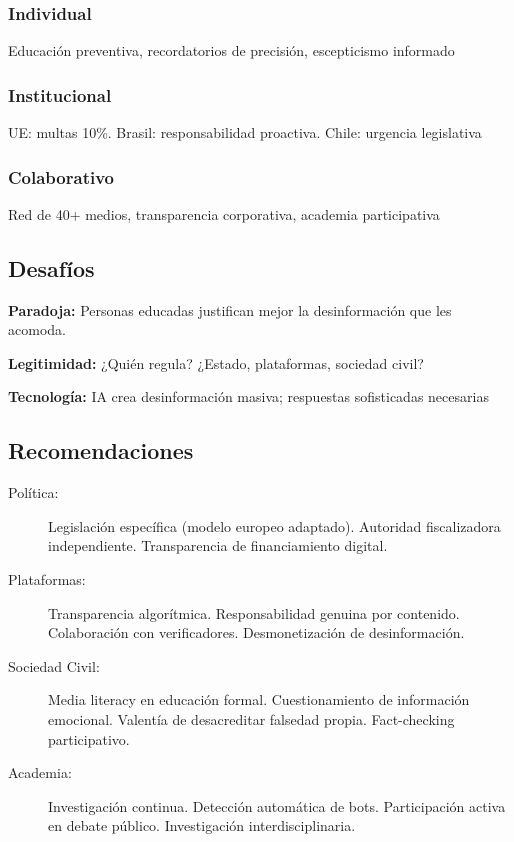 \subsubsection{Individual}
Educación preventiva, recordatorios de precisión, escepticismo informado

\subsubsection{Institucional}
UE: multas 10\%. Brasil: responsabilidad proactiva. Chile: urgencia legislativa

\subsubsection{Colaborativo}
Red de 40+ medios, transparencia corporativa, academia participativa

\subsection{Desafíos}

\textbf{Paradoja:} Personas educadas justifican mejor la desinformación que les acomoda.

\textbf{Legitimidad:} ¿Quién regula? ¿Estado, plataformas, sociedad civil?

\textbf{Tecnología:} IA crea desinformación masiva; respuestas sofisticadas necesarias

\subsection{Recomendaciones}

\begin{description}
    \item[Política:] Legislación específica (modelo europeo adaptado). Autoridad fiscalizadora independiente. Transparencia de financiamiento digital.
    
    \item[Plataformas:] Transparencia algorítmica. Responsabilidad genuina por contenido. Colaboración con verificadores. Desmonetización de desinformación.
    
    \item[Sociedad Civil:] Media literacy en educación formal. Cuestionamiento de información emocional. Valentía de desacreditar falsedad propia. Fact-checking participativo.
    
    \item[Academia:] Investigación continua. Detección automática de bots. Participación activa en debate público. Investigación interdisciplinaria.
\end{description}

